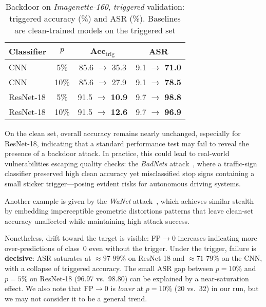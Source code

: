 \documentclass{article}
\begin{document}
\begin{table}[H]
  \caption{Backdoor on \textit{Imagenette-160}, \emph{triggered} validation: 
  triggered accuracy (\%) and ASR (\%). Baselines are clean-trained models 
  on the triggered set}
  \label{tab:backdoor-triggered}
  \centering
  \begin{small}
    \begin{tabular}{lccc}
      \toprule
      Classifier & $p$  & Acc$_\text{trig}$ & ASR \\
      \midrule
      CNN        & 5\%  & 85.6 $\rightarrow$ 35.3 & 9.1 $\rightarrow$ \textbf{71.0} \\
      CNN        & 10\% & 85.6 $\rightarrow$ 27.9 & 9.1 $\rightarrow$ \textbf{78.5} \\
      ResNet-18  & 5\%  & 91.5 $\rightarrow$ \textbf{10.9} & 9.7 $\rightarrow$ \textbf{98.8} \\
      ResNet-18  & 10\% & 91.5 $\rightarrow$ \textbf{12.6} & 9.7 $\rightarrow$ \textbf{96.9} \\
      \bottomrule
    \end{tabular}
  \end{small}
  \vspace{-0.35cm}
\end{table}

On the clean set, overall accuracy remains nearly unchanged, especially for ResNet-18, indicating that a standard performance test may fail to reveal the presence of a backdoor attack. In practice, this could lead to real-world vulnerabilities escaping quality checks: the \textit{BadNets} attack~\cite{gu2019badnetsidentifyingvulnerabilitiesmachine}, where a traffic-sign classifier preserved high clean accuracy yet misclassified stop signs containing a small sticker trigger—posing evident risks for autonomous driving systems.

Another example is given by the \textit{WaNet} attack~\cite{nguyen2021wanetimperceptiblewarpingbased}, which achieves similar stealth by embedding imperceptible geometric distortions patterns that leave clean-set accuracy unaffected while maintaining high attack success.

Nonetheless, drift toward the target is visible: FP$\to$0 increases indicating more over-predictions of class~0 even without the trigger. Under the trigger, failure is \textbf{decisive}: ASR saturates at ${\approx}97$-$99\%$ on ResNet-18 and ${\approx}71$-$79\%$ on the CNN, with a collapse of triggered accuracy. The small ASR gap between $p{=}10\%$ and $p{=}5\%$ on ResNet-18 (96.97 vs.\ 98.80) can be explained by a near-saturation effect. We also note that FP$\to$0 is \emph{lower} at $p{=}10\%$ (20 vs.\ 32) in our run, but we may not consider it to be a general trend.
\end{document}
